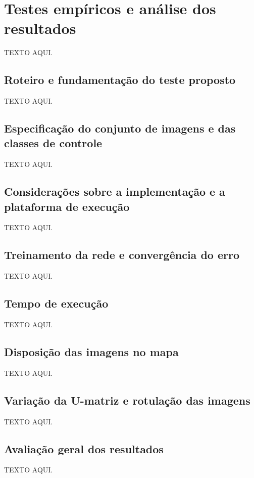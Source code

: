 \chapter{Testes empíricos e análise dos resultados}

TEXTO AQUI.

\section{Roteiro e fundamentação do teste proposto}

TEXTO AQUI.

\section{Especificação do conjunto de imagens e das classes de controle}

TEXTO AQUI.

\section{Considerações sobre a implementação e a plataforma de execução}

TEXTO AQUI.

\section{Treinamento da rede e convergência do erro}

TEXTO AQUI.

\section{Tempo de execução}

TEXTO AQUI.

\section{Disposição das imagens no mapa}

TEXTO AQUI.

\section{Variação da U-matriz e rotulação das imagens}

TEXTO AQUI.

\section{Avaliação geral dos resultados}

TEXTO AQUI.
